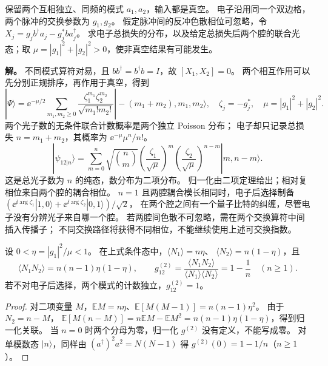 \begin{exbox}
保留两个互相独立、同频的模式 $a_1,a_2$，输入都是真空。
电子沿用同一个双边格，两个脉冲的交换参数为 $g_1,g_2$。
假定脉冲间的反冲色散相位可忽略，令
$X_j=g_jb^\dagger a_j-g_j^*ba_j^\dagger$。
求电子总损失的分布，以及给定总损失后两个腔的联合光态；取 $\mu=|g_1|^2+|g_2|^2>0$，使非真空结果有可能发生。

\textbf{解。} 不同模式算符对易，且 $bb^\dagger=b^\dagger b=I$，故 $[X_1,X_2]=0$。
两个相互作用可以先分别正规排序，再作用于真空，得到
\begin{equation}
|\Psi\rangle=\ee^{-\mu/2}\sum_{m_1,m_2\ge0}
\frac{\zeta_1^{m_1}\zeta_2^{m_2}}{\sqrt{m_1!m_2!}}
|-(m_1+m_2),m_1,m_2\rangle,
\quad\zeta_j=-g_j^*,\quad\mu=|g_1|^2+|g_2|^2.
\label{eq:feqo-two-cavity-vacuum-joint}
\end{equation}
两个光子数的无条件联合计数概率是两个独立 Poisson 分布；
电子却只记录总损失 $n=m_1+m_2$，其概率为 $\ee^{-\mu}\mu^n/n!$。
\begin{equation}
|\psi_{12|n}\rangle=\sum_{m=0}^n
\sqrt{\binom nm}\left(\frac{\zeta_1}{\sqrt\mu}\right)^m
\left(\frac{\zeta_2}{\sqrt\mu}\right)^{n-m}|m,n-m\rangle.
\label{eq:feqo-two-cavity-heralded-binomial}
\end{equation}
这是总光子数为 $n$ 的纯态，数分布为二项分布。
归一化由二项定理给出；相对复相位来自两个腔的耦合相位。
$n=1$ 且两腔耦合模长相同时，电子后选择制备
$(\ee^{\ii\arg\zeta_1}|1,0\rangle+
\ee^{\ii\arg\zeta_2}|0,1\rangle)/\sqrt2$，
在两个腔之间有一个量子比特的纠缠，尽管电子没有分辨光子来自哪一个腔。
若两腔间色散不可忽略，需在两个交换算符中间插入传播子；
不同交换路径将获得不同相位，不能继续使用上述可交换指数。
\end{exbox}

\begin{proposition}[条件光子计数与二阶关联]
设 $0<\eta=|g_1|^2/\mu<1$。
在上式条件态中，$\langle N_1\rangle=n\eta$、
$\langle N_2\rangle=n(1-\eta)$，且
\begin{equation}
\langle N_1N_2\rangle=n(n-1)\eta(1-\eta),\qquad
g_{12}^{(2)}=\frac{\langle N_1N_2\rangle}
{\langle N_1\rangle\langle N_2\rangle}=1-\frac1n\quad(n\ge1).
\label{eq:feqo-heralded-hbt-correlation}
\end{equation}
若不对电子后选择，两个模式的计数独立，$g_{12}^{(2)}=1$。
\end{proposition}
\begin{proof}
对二项变量 $M$，$\mathbb EM=n\eta$、$\mathbb E[M(M-1)]=n(n-1)\eta^2$。
由于 $N_2=n-M$，
$\mathbb E[M(n-M)]=n\mathbb EM-\mathbb EM^2
=n(n-1)\eta(1-\eta)$，得到归一化关联。
当 $n=0$ 时两个分母为零，归一化 $g^{(2)}$ 没有定义，不能写成零。
对单模数态 $|n\rangle$，同样由 $(a^\dagger)^2a^2=N(N-1)$ 得
$g^{(2)}(0)=1-1/n$（$n\ge1$）。
\end{proof}

